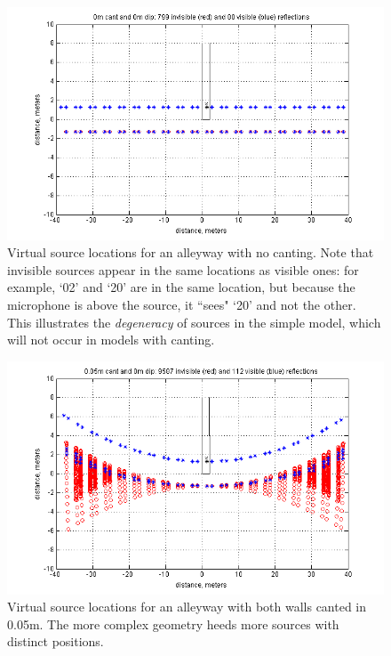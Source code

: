 \documentclass{aes137}
\begin{document}
\begin{figure}[h!] \centering \includegraphics[width=\linewidth, trim=13mm 2mm 10mm 3mm, clip]{images/ISM_0m_cant_0m_dip.png} 
\caption{Virtual source locations for an alleyway with no canting. Note that invisible sources appear in the same locations as visible ones: for example, `02' and `20' are in the same location, but because the microphone is above the source, it ``sees" `20' and not the other. This illustrates the \textit{degeneracy} of sources in the simple model, which will not occur in models with canting.} 
\end{figure}

\begin{figure}[h!] \centering \includegraphics[width=\linewidth, trim=13mm 2mm 10mm 3mm, clip]{images/ISM_0pt05m_cant_0m_dip.png} 
\caption{Virtual source locations for an alleyway with both walls canted in 0.05m. The more complex geometry heeds more sources with distinct positions.} 
\end{figure}
\end{document}
